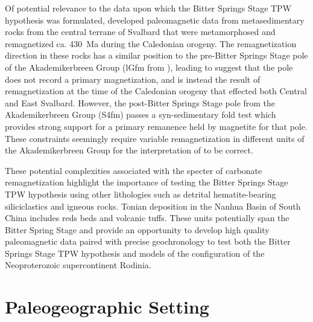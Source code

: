Of potential relevance to the data upon which the Bitter Springs Stage TPW hypothesis was formulated, \citet{Michalski2011a} developed paleomagnetic data from metasedimentary rocks from the central terrane of Svalbard that were metamorphosed and remagnetized ca. 430~Ma during the Caledonian orogeny. The remagnetization direction in these rocks has a similar position to the pre-Bitter Springs Stage pole of the Akademikerbreen Group (lGfm from \citealp{Maloof2006a}), leading \citet{Michalski2011a} to suggest that the pole does not record a primary magnetization, and is instead the result of remagnetization at the time of the Caledonian orogeny that effected both Central and East Svalbard. However, the post-Bitter Springs Stage pole from the Akademikerbreen Group (S4fm) passes a syn-sedimentary fold test which provides strong support for a primary remanence held by magnetite for that pole. These constraints seemingly require variable remagnetization in different units of the Akademikerbreen Group for the interpretation of \citet{Michalski2011a} to be correct.

These potential complexities associated with the specter of carbonate remagnetization highlight the importance of testing the Bitter Springs Stage TPW hypothesis using other lithologies such as detrital hematite-bearing siliciclastics and igneous rocks. Tonian deposition in the Nanhua Basin of South China includes reds beds and volcanic tuffs. These units potentially span the Bitter Spring Stage and provide an opportunity to develop high quality paleomagnetic data paired with precise geochronology to test both the Bitter Springs Stage TPW hypothesis and models of the configuration of the Neoproterozoic supercontinent Rodinia.

\section{Paleogeographic Setting}

